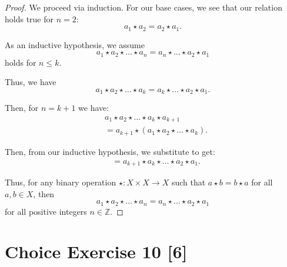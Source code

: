 \documentclass{article}
\begin{document}
\begin{proof}
    We proceed via induction. For our base cases, we see that our relation holds
    true for \(n = 2\):
    \[a_1 \star a_2 = a_2 \star a_1.\]

    As an inductive hypothesis, we assume 
    \[a_1 \star a_2 \star \dots \star a_n = a_n \star \dots \star a_2 \star a_1\]
    holds for \(n \le k\). 

    Thus, we have
    \[a_1 \star a_2 \star \dots \star a_k = a_k \star \dots \star a_2 \star a_1.\]

    Then, for \(n = k+1\) we have:
    \begin{align*}
        &a_1 \star a_2 \star \dots \star a_k \star a_{k+1}\\
        &= a_{k+1} \star (a_1 \star a_2 \star \dots \star a_k).
    \end{align*}

    Then, from our inductive hypothesis, we substitute to get:
    \begin{align*}
        &= a_{k+1} \star a_k \star \dots \star a_2 \star a_1.
    \end{align*}

    Thus, for any binary operation \(\star: X \times X \rightarrow X\) such that 
    \(a \star b = b \star a\) for all \(a, b \in X\), then 
    \[a_1 \star a_2 \star \dots \star a_n = a_n \star \dots \star a_2 \star a_1\]
    for all positive integers \(n \in \mathbb{Z}\). 
\end{proof}

\section*{Choice Exercise 10 [6]}
\end{document}

